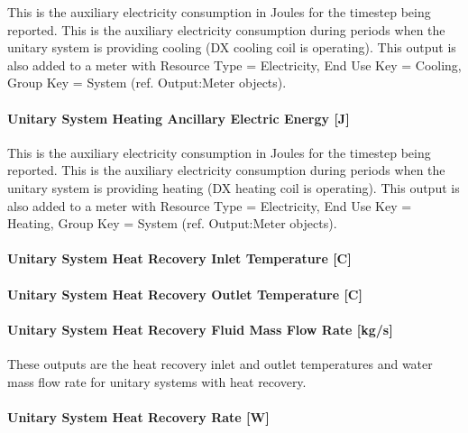 This is the auxiliary electricity consumption in Joules for the timestep being reported. This is the auxiliary electricity consumption during periods when the unitary system is providing cooling (DX cooling coil is operating). This output is also added to a meter with Resource Type = Electricity, End Use Key = Cooling, Group Key = System (ref. Output:Meter objects).

\paragraph{Unitary System Heating Ancillary Electric Energy {[}J{]}}\label{unitary-system-heating-ancillary-electric-energy-j}

This is the auxiliary electricity consumption in Joules for the timestep being reported. This is the auxiliary electricity consumption during periods when the unitary system is providing heating (DX heating coil is operating). This output is also added to a meter with Resource Type = Electricity, End Use Key = Heating, Group Key = System (ref. Output:Meter objects).

\paragraph{Unitary System Heat Recovery Inlet Temperature {[}C{]}}\label{unitary-system-heat-recovery-inlet-temperature-c}

\paragraph{Unitary System Heat Recovery Outlet Temperature {[}C{]}}\label{unitary-system-heat-recovery-outlet-temperature-c}

\paragraph{Unitary System Heat Recovery Fluid Mass Flow Rate {[}kg/s{]}}\label{unitary-system-heat-recovery-fluid-mass-flow-rate-kgs}

These outputs are the heat recovery inlet and outlet temperatures and water mass flow rate for unitary systems with heat recovery.

\paragraph{Unitary System Heat Recovery Rate {[}W{]}}\label{unitary-system-heat-recovery-rate-w}

